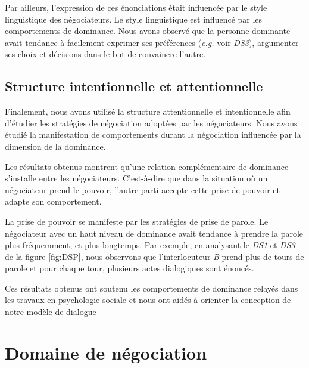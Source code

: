 Par ailleurs, l'expression de ces énonciations était influencée par le style linguistique des négociateurs.  Le style linguistique est influencé par les comportements de dominance. Nous avons observé que la personne dominante avait tendance à facilement exprimer ses préférences (\emph{e.g.} voir \emph{DS3}), argumenter ses choix et décisions dans le but de convaincre l'autre.  


\subsection{Structure intentionnelle et attentionnelle}

Finalement, nous avons utilisé la structure attentionnelle et intentionnelle afin d'étudier les stratégies de négociation adoptées par les négociateurs. Nous avons étudié la manifestation de comportements durant la négociation influencée par la dimension de la dominance.

Les résultats obtenus montrent qu'une relation complémentaire de dominance s'installe entre les négociateurs. C'est-à-dire que dans la situation où un négociateur prend le pouvoir, l'autre parti accepte cette prise de pouvoir et adapte son comportement.

La prise de pouvoir se manifeste par les stratégies de prise de parole. Le négociateur avec un haut niveau de dominance avait tendance à prendre la parole plus fréquemment, et plus longtemps. Par exemple, en analysant le \emph{DS1} et \emph{DS3} de la figure \ref{fig:DSP}, nous observons que l'interlocuteur \textit{B} prend plus de tours de parole et pour chaque tour, plusieurs actes dialogiques sont énoncés. 

Ces résultats obtenus ont soutenu les comportements de dominance relayés dans les travaux en psychologie sociale et nous ont aidés à orienter la conception de notre modèle de dialogue




\section{Domaine de négociation}
\label{domaine}


